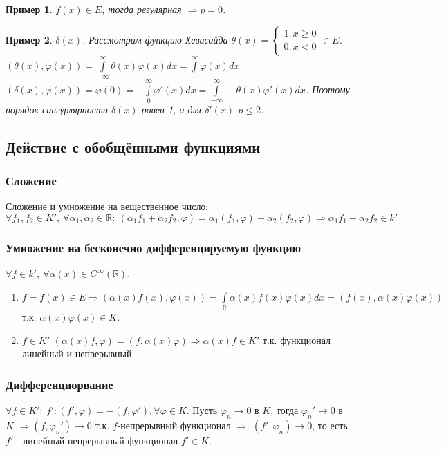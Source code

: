 \documentclass[9pt, a4paper]{article}
\newtheorem*{sample}{Пример}
\begin{document}
			\begin{sample}
				$f(x) \in E$, тогда регулярная $\Rightarrow p = 0$.
			\end{sample}
			\begin{sample}
				$\delta(x)$. Рассмотрим функцию Хевисайда $\theta(x)  =\begin{cases}
					1, x \geq 0 \\
					0, x < 0
				\end{cases} \in E$. $(\theta(x), \varphi(x)) = \int\limits_{-\infty}^{\infty} \theta(x) \varphi(x) dx = \int\limits_{0}^{\infty} \varphi(x) dx$ \newline
				$(\delta(x), \varphi(x)) = \varphi(0)  = - \int\limits_{0}^{\infty} \varphi'(x) dx = \int\limits_{-\infty}^{\infty} - \theta(x) \varphi'(x) dx$. Поэтому порядок сингурлярности $\delta(x)$ равен 1, а для $\delta'(x)$ $p \leq 2$.
			\end{sample}
	\subsection{Действие с обобщёнными функциями}
		\subsubsection{Сложение}
			Сложение и умножение на вещественное число: $\forall f_1, f_2 \in K', \ \forall \alpha_1, \alpha_2 \in \mathbb{R}: \ (\alpha_1f_1+\alpha_2f_2, \varphi) = \alpha_1(f_1, \varphi)+\alpha_2(f_2, \varphi) \Rightarrow \alpha_1f_1+\alpha_2f_2 \in k'$
		\subsubsection{Умножение на бесконечно дифференцируемую функцию}
			$\forall f \in k', \ \forall \alpha(x) \in C^\infty (\mathbb{R})$. 
			\begin{enumerate}
				\item $f = f(x) \in E \Rightarrow (\alpha(x)f(x), \varphi(x)) = \int\limits_{\mathbb{R}} \alpha(x)f(x)\varphi(x) dx = (f(x), \alpha(x)\varphi(x))$ т.к. $\alpha(x)\varphi(x) \in K$.
				\item $f \in K'$ $(\alpha(x)f, \varphi) = (f, \alpha(x)\varphi) \Rightarrow \alpha(x) f \in K'$ т.к. функционал линейный и непрерывный.
			\end{enumerate}
		\subsubsection{Дифференциорвание}
			$\forall f \in K': \ f':(f', \varphi) = -(f, \varphi'), \forall \varphi \in K$. Пусть $\varphi_n \to 0$ в $K$, тогда $\varphi_n' \to 0 $ в $K$ $\Rightarrow (f, \varphi_n') \to 0$ т.к. $f$-непрерывный функционал $\Rightarrow$  $(f', \varphi_n) \to 0$, то есть  $f'$ - линейный непрерывный функционал $f' \in K$.
			
\end{document}
